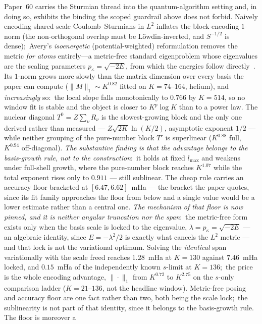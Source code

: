 \documentclass[aps,pra,twocolumn,superscriptaddress,longbibliography]{revtex4-2}
\begin{document}
Paper~60 carries the Sturmian thread into the quantum-algorithm setting
and, in doing so, exhibits the binding the scoped guardrail above does
not forbid.  Naively encoding shared-scale Coulomb--Sturmians in $L^2$
inflates the block-encoding $1$-norm (the non-orthogonal overlap must be
L\"owdin-inverted, and $S^{-1/2}$ is dense);\ Avery's \emph{isoenergetic} (potential-weighted)
reformulation removes the metric \emph{for atoms} entirely---a metric-free
standard eigenproblem whose eigenvalues are the scaling parameters
$p_\kappa=\sqrt{-2E}$, from which the energies follow
directly~\cite{loutey_paper60}.  Its $1$-norm grows more slowly than the
matrix dimension over every basis the paper can compute ($\|M\|_1\sim
K^{0.82}$ fitted on $K=74$--$164$, helium), and \emph{increasingly} so:\ the
local slope falls monotonically to $0.766$ by $K=514$, so no window fit is
stable and the object is closer to $K^{p}\log K$ than to a power law.  The
nuclear diagonal $T^0=Z\sum_\nu R_\nu$ is the slowest-growing block and the
only one derived rather than measured --- $Z\sqrt{2K}\ln(K/2)$, asymptotic
exponent $1/2$ --- while neither grouping of the pure-number block $T'$ is
superlinear ($K^{0.88}$ full, $K^{0.94}$ off-diagonal).  \emph{The
substantive finding is that the advantage belongs to the basis-growth rule,
not to the construction}:\ it holds at fixed $l_{\max}$ and weakens under
full-shell growth, where the pure-number block reaches $K^{1.07}$ while the
total exponent rises only to $0.911$ --- still sublinear.  The cheap rule
carries an accuracy
floor bracketed at $[6.47,6.62]$~mHa --- the bracket the paper quotes, since its fit family approaches the floor from below and a single value would be a lower estimate rather than a central one.  \emph{The mechanism of that floor is now pinned, and it is
neither angular truncation nor the span}:\ the metric-free form exists only when
the basis scale is locked to the eigenvalue, $\lambda=p_\kappa=\sqrt{-2E}$ ---
an algebraic identity, since $E=-\lambda^{2}/2$ is exactly what cancels the
$L^{2}$ metric --- and that lock is not the variational optimum.  Solving the
\emph{identical} span variationally with the scale freed reaches $1.28$~mHa at
$K=130$ against $7.46$~mHa locked, and $0.15$~mHa of the independently known
$s$-limit at $K=136$;\ the price is the whole encoding advantage, $\|\cdot\|_1$
from $K^{0.72}$ to $K^{2.75}$ on the $s$-only comparison ladder
($K=21$--$136$, not the headline window).  Metric-free posing and accuracy floor are one
fact rather than two, both being the scale lock;\ the sublinearity is not part
of that identity, since it belongs to the basis-growth rule.  The floor is moreover a
\end{document}
